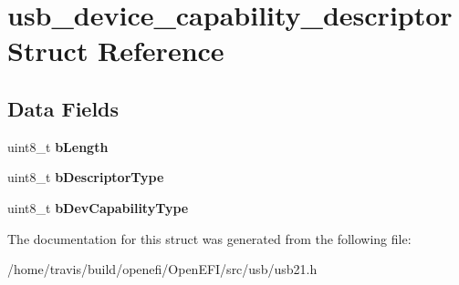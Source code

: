 \hypertarget{structusb__device__capability__descriptor}{}\section{usb\+\_\+device\+\_\+capability\+\_\+descriptor Struct Reference}
\label{structusb__device__capability__descriptor}
\subsection*{Data Fields}
\begin{DoxyCompactItemize}
\item 
\mbox{\label{structusb__device__capability__descriptor_ac935ef2a3a2f8ca6c47b191d23d7134b}} 
uint8\+\_\+t {\bfseries b\+Length}
\item 
\mbox{\label{structusb__device__capability__descriptor_aa56ce3f80c141b7b6980d5b4aaec3123}} 
uint8\+\_\+t {\bfseries b\+Descriptor\+Type}
\item 
\mbox{\label{structusb__device__capability__descriptor_a9a78b864547cec2add49b840094ff661}} 
uint8\+\_\+t {\bfseries b\+Dev\+Capability\+Type}
\end{DoxyCompactItemize}


The documentation for this struct was generated from the following file\+:\begin{DoxyCompactItemize}
\item 
/home/travis/build/openefi/\+Open\+E\+F\+I/src/usb/usb21.\+h\end{DoxyCompactItemize}
